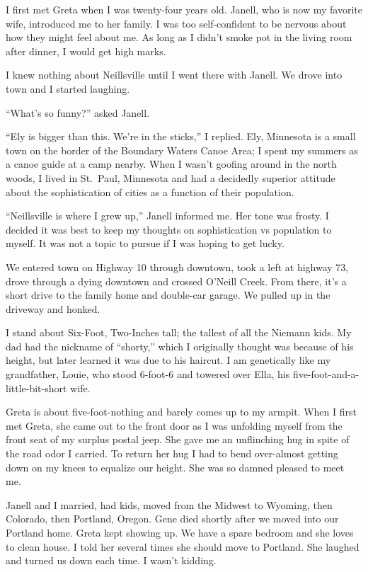 \documentclass[
  letterpaper,
  DIV=11,
  numbers=noendperiod]{scrreprt}
\begin{document}

I first met Greta when I was twenty-four years old. Janell, who is now
my favorite wife, introduced me to her family. I was too self-confident
to be nervous about how they might feel about me. As long as I didn't
smoke pot in the living room after dinner, I would get high marks.

I knew nothing about Neillsville until I went there with Janell. We
drove into town and I started laughing.

``What's so funny?'' asked Janell.

``Ely is bigger than this. We're in the sticks,'' I replied. Ely,
Minnesota is a small town on the border of the Boundary Waters Canoe
Area; I spent my summers as a canoe guide at a camp nearby. When I
wasn't goofing around in the north woods, I lived in St.~Paul, Minnesota
and had a decidedly superior attitude about the sophistication of cities
as a function of their population.

``Neillsville is where I grew up,'' Janell informed me. Her tone was
frosty. I decided it was best to keep my thoughts on sophistication vs
population to myself. It was not a topic to pursue if I was hoping to
get lucky.

We entered town on Highway 10 through downtown, took a left at highway
73, drove through a dying downtown and crossed O'Neill Creek. From
there, it's a short drive to the family home and double-car garage. We
pulled up in the driveway and honked.

I stand about Six-Foot, Two-Inches tall; the tallest of all the Niemann
kids. My dad had the nickname of ``shorty,'' which I originally thought
was because of his height, but later learned it was due to his haircut.
I am genetically like my grandfather, Louie, who stood 6-foot-6 and
towered over Ella, his five-foot-and-a-little-bit-short wife.

Greta is about five-foot-nothing and barely comes up to my armpit. When
I first met Greta, she came out to the front door as I was unfolding
myself from the front seat of my surplus postal jeep. She gave me an
unflinching hug in spite of the road odor I carried. To return her hug I
had to bend over-almost getting down on my knees to equalize our height.
She was so damned pleased to meet me.

Janell and I married, had kids, moved from the Midwest to Wyoming, then
Colorado, then Portland, Oregon. Gene died shortly after we moved into
our Portland home. Greta kept showing up. We have a spare bedroom and
she loves to clean house. I told her several times she should move to
Portland. She laughed and turned us down each time. I wasn't kidding.
\end{document}
